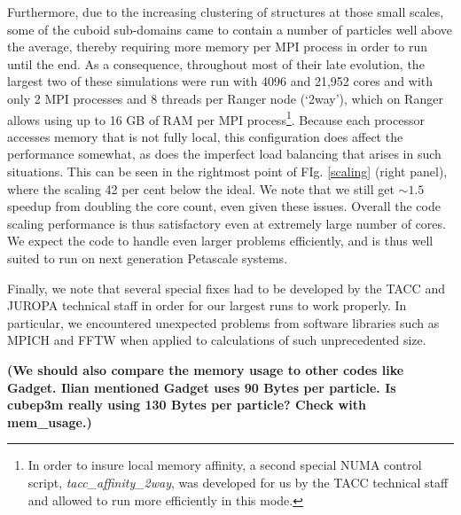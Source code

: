 Furthermore, due to the increasing clustering of structures at those small 
scales, some of the cuboid sub-domains came to contain a number of particles
well above the 
average, thereby requiring more memory per {\small MPI} process
in order to run until the end. 
As a consequence,  throughout most of their late evolution, the 
largest two of these simulations were run with 4096 and 21,952 cores and 
with only 2 {\small MPI} processes and 8 threads per Ranger node (`2way'), which on 
Ranger allows using up to 16 GB of RAM per {\small MPI} process\footnote{In order to insure 
local memory affinity,  a second special NUMA control script, {\it tacc\_affinity\_2way}, 
was developed for us by the TACC technical staff and allowed to run more efficiently 
in this mode.}. Because each processor accesses memory that is not fully local, this configuration does affect the 
performance somewhat, as does the imperfect load balancing that arises in such situations.
This can be seen in the rightmost point of FIg. \ref{scaling} (right panel), where the scaling 42 per cent below the ideal.
We note that we still get $\sim1.5$ speedup
from doubling the core count, even given these issues. Overall the
code scaling performance is thus satisfactory even at extremely large number of cores.
 We expect the code to handle even larger problems efficiently, and is thus well suited to run on
  next generation Petascale systems. 

Finally, we note that several special fixes had to be developed by  the TACC 
and JUROPA technical staff in order for our largest runs to work properly.
In particular, we encountered unexpected problems from software libraries such as 
{\small MPICH} and {\small FFTW} when applied to calculations of such 
unprecedented size. 

{\bf (We should also compare the memory usage to other codes like Gadget. Ilian mentioned Gadget uses 90 Bytes per particle. Is cubep3m really using 130 Bytes per particle? Check with mem\_usage.)}
